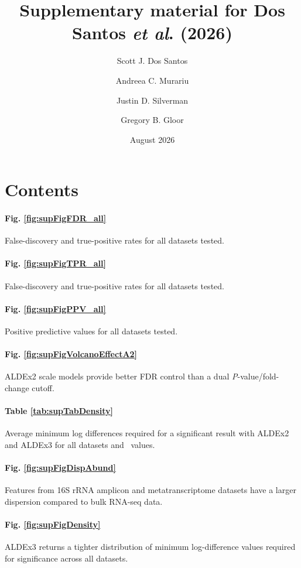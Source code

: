 \documentclass[11pt,a4paper]{article}
\title{\textbf{Supplementary material for Dos Santos \textit{et al}. (2026)}}
\author[$\dagger$ ]{Scott J. Dos Santos}
\author[$\dagger$ ]{Andreea C. Murariu}
\author[ ]{Justin D. Silverman}
\author[*]{Gregory B. Gloor}
\affil[$\dagger$]{Equal contribution}
\affil[*]{Corresponding author}
\date{August 2026}
\begin{document}
\maketitle

\section*{Contents}

\paragraph*{Fig. \ref{fig:supFigFDR_all}}
False-discovery and true-positive rates for all datasets tested.

\paragraph*{Fig. \ref{fig:supFigTPR_all}}
False-discovery and true-positive rates for all datasets tested.

\paragraph*{Fig. \ref{fig:supFigPPV_all}}
Positive predictive values for all datasets tested.

\paragraph*{Fig. \ref{fig:supFigVolcanoEffectA2}}
ALDEx2 scale models provide better FDR control than a dual \textit{P}-value/fold-change cutoff.

\paragraph*{Table \ref{tab:supTabDensity}}
Average minimum log differences required for a significant result with ALDEx2 and ALDEx3 for all datasets and \textgamma~values.

\paragraph*{Fig. \ref{fig:supFigDispAbund}}
Features from 16S rRNA amplicon and metatranscriptome datasets have a larger dispersion compared to bulk RNA-seq data.

\paragraph*{Fig. \ref{fig:supFigDensity}}
ALDEx3 returns a tighter distribution of minimum log-difference values required for significance across all datasets.
\end{document}
